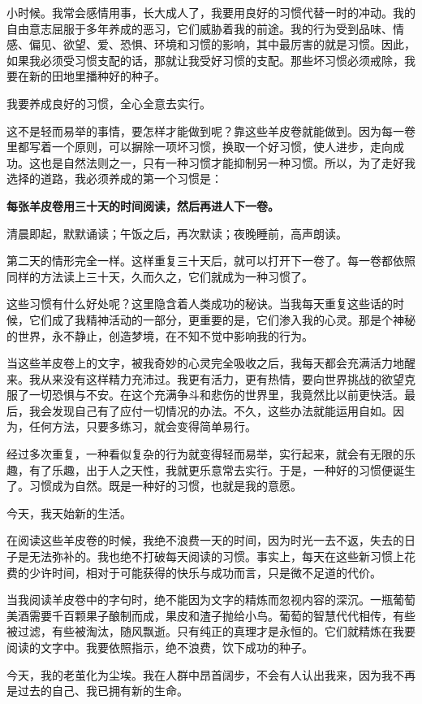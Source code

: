 \documentclass[UTF8,a5paper]{ctexart}
\begin{document}
小时候。我常会感情用事，长大成人了，我要用良好的习惯代替一时的冲动。我的自由意志屈服于多年养成的恶习，它们威胁着我的前途。我的行为受到品味、情感、偏见、欲望、爱、恐惧、环境和习惯的影响，其中最厉害的就是习惯。因此，如果我必须受习惯支配的话，那就让我受好习惯的支配。那些坏习惯必须戒除，我要在新的田地里播种好的种子。

我要养成良好的习惯，全心全意去实行。

这不是轻而易举的事情，要怎样才能做到呢？靠这些羊皮卷就能做到。因为每一卷里都写着一个原则，可以摒除一项坏习惯，换取一个好习惯，使人进步，走向成功。这也是自然法则之一，只有一种习惯才能抑制另一种习惯。所以，为了走好我选择的道路，我必须养成的第一个习惯是：

\textbf{每张羊皮卷用三十天的时间阅读，然后再进人下一卷。}

清晨即起，默默诵读；午饭之后，再次默读；夜晚睡前，高声朗读。

第二天的情形完全一样。这样重复三十天后，就可以打开下一卷了。每一卷都依照同样的方法读上三十天，久而久之，它们就成为一种习惯了。

这些习惯有什么好处呢？这里隐含着人类成功的秘诀。当我每天重复这些话的时候，它们成了我精神活动的一部分，更重要的是，它们渗入我的心灵。那是个神秘的世界，永不静止，创造梦境，在不知不觉中影响我的行为。

当这些羊皮卷上的文字，被我奇妙的心灵完全吸收之后，我每天都会充满活力地醒来。我从来没有这样精力充沛过。我更有活力，更有热情，要向世界挑战的欲望克服了一切恐惧与不安。在这个充满争斗和悲伤的世界里，我竟然比以前更快活。最后，我会发现自己有了应付一切情况的办法。不久，这些办法就能运用自如。因为，任何方法，只要多练习，就会变得简单易行。

经过多次重复，一种看似复杂的行为就变得轻而易举，实行起来，就会有无限的乐趣，有了乐趣，出于人之天性，我就更乐意常去实行。于是，一种好的习惯便诞生了。习惯成为自然。既是一种好的习惯，也就是我的意愿。

今天，我天始新的生活。

在阅读这些羊皮卷的时候，我绝不浪费一天的时间，因为时光一去不返，失去的日子是无法弥补的。我也绝不打破每天阅读的习惯。事实上，每天在这些新习惯上花费的少许时间，相对于可能获得的快乐与成功而言，只是微不足道的代价。

当我阅读羊皮卷中的字句时，绝不能因为文字的精炼而忽视内容的深沉。一瓶葡萄美酒需要千百颗果子酿制而成，果皮和渣子抛给小鸟。葡萄的智慧代代相传，有些被过滤，有些被淘汰，随风飘逝。只有纯正的真理才是永恒的。它们就精炼在我要阅读的文字中。我要依照指示，绝不浪费，饮下成功的种子。

今天，我的老茧化为尘埃。我在人群中昂首阔步，不会有人认出我来，因为我不再是过去的自己、我已拥有新的生命。
\end{document}
